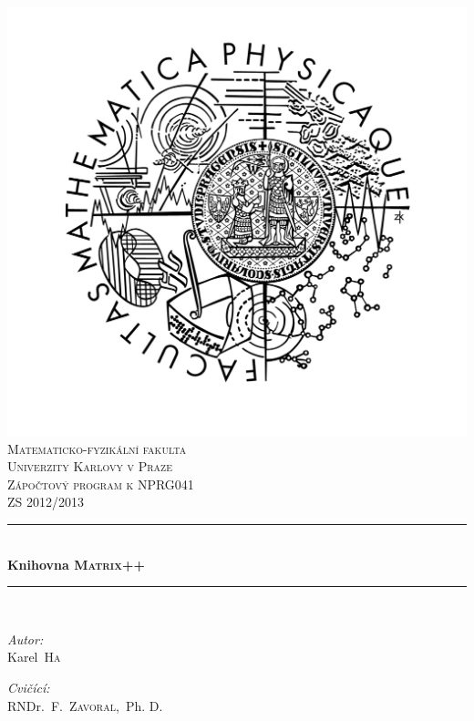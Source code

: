 \documentclass[11pt,a4paper]{article}
\newcommand{\HRule}{\rule{\linewidth}{0.5mm}}
\newcommand{\mpp}{\textsc{Matrix++}}
\begin{document}
\begin{titlepage}
\begin{center}
\includegraphics[viewport=180 50 100 100,scale=0.5]{./logo_mff.jpg}\\[1cm]    

\textsc{\LARGE Matematicko-fyzikální fakulta\\[0.1cm]
Univerzity Karlovy v Praze}\\[1.5cm]

\textsc{\Large Zápočtový program k NPRG041\\ ZS 2012/2013}\\[0.5cm]


\HRule \\[0.4cm]
{ \huge \bfseries Knihovna \mpp}\\[0.4cm]

\HRule \\[1.5cm]

\begin{minipage}{0.4\textwidth}
\begin{flushleft} \large
\emph{Autor:}\\
Karel~\textsc{Ha}
\end{flushleft}
\end{minipage}
\begin{minipage}{0.4\textwidth}
\begin{flushright} \large
\emph{Cvičící:} \\
RNDr.~F.~\textsc{Zavoral},~Ph. D.
\end{flushright}
\end{minipage}


\end{center}
\end{titlepage}
\end{document}
